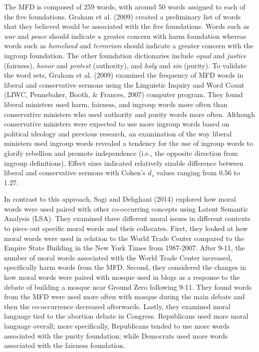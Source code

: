 \documentclass[
  man,floatsintext]{apa6}
\begin{document}
The MFD is composed of 259 words, with around 50 words assigned to each
of the five foundations. Graham et al. (2009) created a preliminary list of words
that they believed would be associated with the five foundations. Words
such as \emph{war} and \emph{peace} should indicate a greater concern with harm
foundation whereas words such as \emph{homeland} and \emph{terrorism} should
indicate a greater concern with the ingroup foundation. The other
foundation dictionaries include \emph{equal} and \emph{justice} (fairness),
\emph{honor} and \emph{protest} (authority), and \emph{holy} and \emph{sin} (purity). To
validate the word sets, Graham et al. (2009) examined the frequency of MFD words
in liberal and conservative sermons using the Linguistic Inquiry and
Word Count (LIWC, Pennebaker, Booth, \& Frances, 2007) computer program. They found liberal
ministers used harm, fairness, and ingroup words more often than
conservative ministers who used authority and purity words more
often. Although conservative ministers were expected to use more
ingroup words based on political ideology and previous research, an
examination of the way liberal ministers used ingroup words revealed a
tendency for the use of ingroup words to glorify rebellion and promote
independence (i.e., the opposite direction from ingroup definitions).
Effect sizes indicated relatively sizable difference between liberal and
conservative sermons with Cohen's \(d_s\) values ranging from 0.56 to 1.27.

In contrast to this approach, Sagi and Dehghani (2014) explored how moral words were
used paired with other co-occurring concepts using Latent Semantic
Analysis (LSA). They examined three different moral issues in different
contexts to piece out specific moral words and their collocates. First,
they looked at how moral words were used in relation to the World Trade
Center compared to the Empire State Building in the New York Times from
1987-2007. After 9-11, the number of moral words associated with the
World Trade Center increased, specifically harm words from the MFD.
Second, they considered the changes in how moral words were paired with
mosque used in blogs as a response to the debate of building a mosque
near Ground Zero following 9-11. They found words from the MFD were used
more often with mosque during the main debate and then the co-occurrence
decreased afterwards. Lastly, they examined moral language tied to the
abortion debate in Congress. Republicans used more moral language
overall; more specifically, Republicans tended to use more words
associated with the purity foundation; while Democrats used more words
associated with the fairness foundation.
\end{document}

